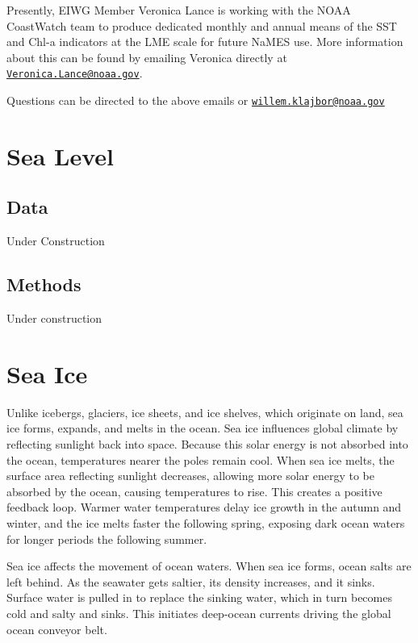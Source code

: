 \documentclass[
]{book}
\begin{document}
Presently, EIWG Member Veronica Lance is working with the NOAA CoastWatch team to produce dedicated monthly and annual means of the SST and Chl-a indicators at the LME scale for future NaMES use. More information about this can be found by emailing Veronica directly at \href{mailto:Veronica.Lance@noaa.gov}{\nolinkurl{Veronica.Lance@noaa.gov}}.

Questions can be directed to the above emails or \href{mailto:willem.klajbor@noaa.gov}{\nolinkurl{willem.klajbor@noaa.gov}}

\hypertarget{sea-level}{%
\chapter{Sea Level}\label{sea-level}}

\hypertarget{data-9}{%
\section{Data}\label{data-9}}

Under Construction

\hypertarget{methods-9}{%
\section{Methods}\label{methods-9}}

Under construction

\hypertarget{sea-ice}{%
\chapter{Sea Ice}\label{sea-ice}}

Unlike icebergs, glaciers, ice sheets, and ice shelves, which originate on land, sea ice forms, expands, and melts in the ocean. Sea ice influences global climate by reflecting sunlight back into space. Because this solar energy is not absorbed into the ocean, temperatures nearer the poles remain cool. When sea ice melts, the surface area reflecting sunlight decreases, allowing more solar energy to be absorbed by the ocean, causing temperatures to rise. This creates a positive feedback loop. Warmer water temperatures delay ice growth in the autumn and winter, and the ice melts faster the following spring, exposing dark ocean waters for longer periods the following summer.

Sea ice affects the movement of ocean waters. When sea ice forms, ocean salts are left behind. As the seawater gets saltier, its density increases, and it sinks. Surface water is pulled in to replace the sinking water, which in turn becomes cold and salty and sinks. This initiates deep-ocean currents driving the global ocean conveyor belt.
\end{document}
